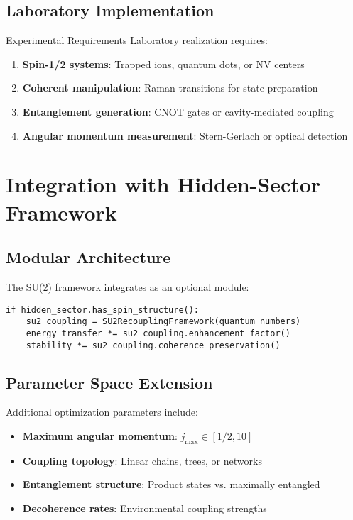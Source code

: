 \documentclass[12pt]{article}
\begin{document}
\subsection{Laboratory Implementation}

\begin{warningbox}{Experimental Requirements}
Laboratory realization requires:

\begin{enumerate}
\item \textbf{Spin-1/2 systems}: Trapped ions, quantum dots, or NV centers
\item \textbf{Coherent manipulation}: Raman transitions for state preparation
\item \textbf{Entanglement generation}: CNOT gates or cavity-mediated coupling
\item \textbf{Angular momentum measurement}: Stern-Gerlach or optical detection
\end{enumerate}
\end{warningbox}

\section{Integration with Hidden-Sector Framework}

\subsection{Modular Architecture}

The SU(2) framework integrates as an optional module:

\begin{verbatim}
if hidden_sector.has_spin_structure():
    su2_coupling = SU2RecouplingFramework(quantum_numbers)
    energy_transfer *= su2_coupling.enhancement_factor()
    stability *= su2_coupling.coherence_preservation()
\end{verbatim}

\subsection{Parameter Space Extension}

Additional optimization parameters include:

\begin{itemize}
\item \textbf{Maximum angular momentum}: $j_{\max} \in [1/2, 10]$
\item \textbf{Coupling topology}: Linear chains, trees, or networks
\item \textbf{Entanglement structure}: Product states vs. maximally entangled
\item \textbf{Decoherence rates}: Environmental coupling strengths
\end{itemize}
\end{document}
